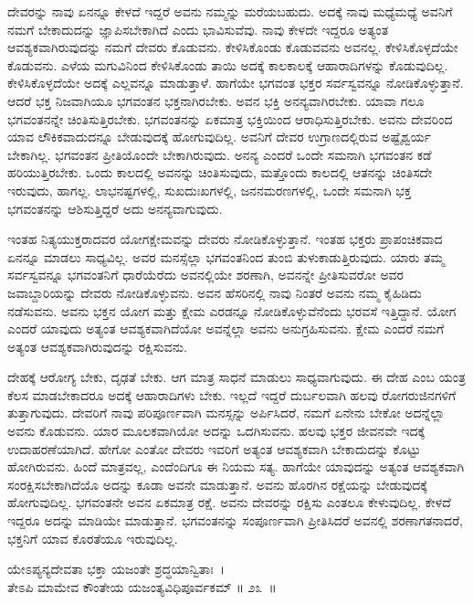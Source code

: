 ದೇವರನ್ನು ನಾವು ಏನನ್ನೂ ಕೇಳದೆ ಇದ್ದರೆ ಅವನು ನಮ್ಮನ್ನು ಮರೆಯಬಹುದು. ಅದಕ್ಕೆ ನಾವು ಮಧ್ಯೆಮಧ್ಯೆ ಅವನಿಗೆ ನಮಗೆ ಬೇಕಾದುದನ್ನು ಜ್ಞಾಪಿಸಬೇಕಾಗಿದೆ ಎಂದು ಭಾವಿಸುವೆವು. ನಾವು ಕೇಳದೇ ಇದ್ದರೂ ಅತ್ಯಂತ ಆವಶ್ಯಕವಾಗಿರುವುದನ್ನು ನಮಗೆ ದೇವರು ಕೊಡುವನು. ಕೇಳಿಸಿಕೊಂಡು ಕೊಡುವವನು ಅವನಲ್ಲ. ಕೇಳಿಸಿಕೊಳ್ಳದೆಯೇ ಕೊಡುವನು. ಎಳೆಯ ಮಗುವಿನಿಂದ ಕೇಳಿಸಿಕೊಂಡು ತಾಯಿ ಅದಕ್ಕೆ ಕಾಲಕಾಲಕ್ಕೆ ಆಹಾರಾದಿಗಳನ್ನು ಕೊಡುವುದಿಲ್ಲ. ಕೇಳಿಸಿಕೊಳ್ಳದೆಯೇ ಅದಕ್ಕೆ ಎಲ್ಲವನ್ನೂ ಮಾಡುತ್ತಾಳೆ. ಹಾಗೆಯೇ ಭಗವಂತ ಭಕ್ತರ ಸರ್ವಸ್ವವನ್ನೂ ನೋಡಿಕೊಳ್ಳುತ್ತಾನೆ. ಆದರೆ ಭಕ್ತ ನಿಜವಾಗಿಯೂ ಭಗವಂತನ ಭಕ್ತನಾಗಿರಬೇಕು. ಅವನ ಭಕ್ತಿ ಅನನ್ಯವಾಗಿರಬೇಕು. ಯಾವಾ ಗಲೂ ಭಗವಂತನನ್ನೇ ಚಿಂತಿಸುತ್ತಿರಬೇಕು. ಭಗವಂತನನ್ನು ಏಕಮಾತ್ರ ಭಕ್ತಿಯಿಂದ ಆರಾಧಿಸುತ್ತಿರಬೇಕು. ಅವನು ದೇವರಿಂದ ಯಾವ ಲೌಕಿಕವಾದುದನ್ನೂ ಬೇಡುವುದಕ್ಕೆ ಹೋಗುವುದಿಲ್ಲ. ಅವನಿಗೆ ದೇವರ ಉಗ್ರಾಣದಲ್ಲಿರುವ ಅಷ್ಟೈಶ್ವರ್ಯ ಬೇಕಾಗಿಲ್ಲ. ಭಗವಂತನ ಪ್ರೀತಿಯೊಂದೇ ಬೇಕಾಗಿರುವುದು. ಅನನ್ಯ ಎಂದರೆ ಒಂದೇ ಸಮನಾಗಿ ಭಗವಂತನ ಕಡೆ ಹರಿಯುತ್ತಿರಬೇಕು. ಒಂದು ಕಾಲದಲ್ಲಿ ಅವನನ್ನು ಚಿಂತಿಸುವುದು, ಮತ್ತೊಂದು ಕಾಲದಲ್ಲಿ ಆತನನ್ನು ಚಿಂತಿಸದೇ ಇರುವುದು, ಹಾಗಲ್ಲ. ಲಾಭನಷ್ಟಗಳಲ್ಲಿ, ಸುಖದುಃಖಗಳಲ್ಲಿ, ಜನನಮರಣಗಳಲ್ಲಿ, ಒಂದೇ ಸಮನಾಗಿ ಭಕ್ತ ಭಗವಂತನನ್ನು ಆಶಿಸುತ್ತಿದ್ದರೆ ಅದು ಅನನ್ಯವಾಗುವುದು.

ಇಂತಹ ನಿತ್ಯಯುಕ್ತರಾದವರ ಯೋಗಕ್ಷೇಮವನ್ನು ದೇವರು ನೋಡಿಕೊಳ್ಳುತ್ತಾನೆ. ಇಂತಹ ಭಕ್ತರು ಪ್ರಾಪಂಚಿಕವಾದ ಏನನ್ನೂ ಮಾಡಲು ಸಾಧ್ಯವಿಲ್ಲ. ಅವರ ಮನಸ್ಸೆಲ್ಲಾ ಭಗವಂತನಿಂದ ತುಂಬಿ ತುಳುಕಾಡುತ್ತಿರುವುದು. ಯಾರು ತಮ್ಮ ಸರ್ವಸ್ವವನ್ನೂ ಭಗವಂತನಿಗೆ ಧಾರೆಯೆರೆದು ಅವನಲ್ಲಿಯೇ ಶರಣಾಗಿ, ಅವನನ್ನೇ ಪ್ರೀತಿಸುವರೋ ಅವರ ಜವಾಬ್ದಾರಿಯನ್ನು ದೇವರು ನೋಡಿ\-ಕೊಳ್ಳುವನು. ಅವನ ಹೆಸರಿನಲ್ಲಿ ನಾವು ನಿಂತರೆ ಅವನು ನಮ್ಮ ಕೈಹಿಡಿದು ನಡೆಸುವನು. ಅವನು ಭಕ್ತನ ಯೋಗ ಮತ್ತು ಕ್ಷೇಮ ಎರಡನ್ನೂ ನೋಡಿಕೊಳ್ಳುವೆನೆಂದು ಭರವಸೆ ಇತ್ತಿದ್ದಾನೆ. ಯೋಗ ಎಂದರೆ ಯಾವುದು ಅತ್ಯಂತ ಆವಶ್ಯಕವಾಗಿದೆಯೋ ಅವನ್ನೆಲ್ಲಾ ಅವನು ಅನುಗ್ರಹಿಸುವನು. ಕ್ಷೇಮ ಎಂದರೆ ನಮಗೆ ಅತ್ಯಂತ ಆವಶ್ಯಕವಾಗಿರುವುದನ್ನು ರಕ್ಷಿಸುವನು.

ದೇಹಕ್ಕೆ ಆರೋಗ್ಯ ಬೇಕು, ದೃಢತೆ ಬೇಕು. ಆಗ ಮಾತ್ರ ಸಾಧನೆ ಮಾಡುಲು ಸಾಧ್ಯವಾಗುವುದು. ಈ ದೇಹ ಎಂಬ ಯಂತ್ರ ಕೆಲಸ ಮಾಡಬೇಕಾದರೂ ಅದಕ್ಕೆ ಆಹಾರಾದಿಗಳು ಬೇಕು. ಇಲ್ಲದೆ ಇದ್ದರೆ ದುರ್ಬಲವಾಗಿ ಹಲವು ರೋಗರುಜಿನಗಳಿಗೆ ತುತ್ತಾಗುವುದು. ದೇವರಿಗೆ ನಾವು ಪರಿಪೂರ್ಣವಾಗಿ ಮನಸ್ಸನ್ನು ಅರ್ಪಿಸಿದರೆ, ನಮಗೆ ಏನೇನು ಬೇಕೋ ಅದನ್ನೆಲ್ಲಾ ಅವನು ಕೊಡುವನು. ಯಾರ ಮೂಲಕವಾಗಿಯೋ ಅದನ್ನು ಒದಗಿಸುವನು. ಹಲವು ಭಕ್ತರ ಜೀವನವೇ ಇದಕ್ಕೆ ಉದಾಹರಣೆಯಾಗಿದೆ. ಹೇಗೋ ಎಂತೋ ದೇವರು ಇವರಿಗೆ ಅತ್ಯಂತ ಆವಶ್ಯಕವಾಗಿ ಬೇಕಾದುದನ್ನು ಕೊಟ್ಟು ಹೋಗಿರುವನು. ಹಿಂದೆ ಮಾತ್ರವಲ್ಲ, ಎಂದೆಂದಿಗೂ ಈ ನಿಯಮ ಸತ್ಯ. ಹಾಗೆಯೇ ಯಾವುದನ್ನು ಅತ್ಯಂತ ಆವಶ್ಯಕವಾಗಿ ಸಂರಕ್ಷಿಸಬೇಕಾಗಿದೆಯೊ ಅದನ್ನು ಕೂಡಾ ಅವನೇ ಮಾಡುತ್ತಾನೆ. ಅವನು ಹೊರಗಿನ ರಕ್ಷೆಯನ್ನು ಬೇಡುವುದಕ್ಕೆ ಹೋಗುವುದಿಲ್ಲ. ಭಗವಂತನೇ ಅವನ ಏಕಮಾತ್ರ ರಕ್ಷೆ. ಅವನು ದೇವರನ್ನು ರಕ್ಷಿಸು ಎಂತಲೂ ಕೇಳುವುದಿಲ್ಲ. ಕೇಳದೆ ಇದ್ದರೂ ಅದನ್ನು ಮಾಡಿಯೇ ಮಾಡುತ್ತಾನೆ. ಭಗವಂತನನ್ನು ಸಂಪೂರ್ಣವಾಗಿ ಪ್ರೀತಿಸಿದರೆ ಅವನಲ್ಲಿ ಶರಣಾಗತನಾದರೆ, ಭಕ್ತನಿಗೆ ಯಾವ ಕೊರತೆಯೂ ಇರುವುದಿಲ್ಲ.

\begin{shloka}
ಯೇಽಪ್ಯನ್ಯದೇವತಾ ಭಕ್ತಾ ಯಜಂತೇ ಶ್ರದ್ಧಯಾನ್ವಿತಾಃ~।\\ತೇಽಪಿ ಮಾಮೇವ ಕೌಂತೇಯ ಯಜಂತ್ಯವಿಧಿಪೂರ್ವಕಮ್ \hfill॥ ೨೩~॥
\end{shloka}

